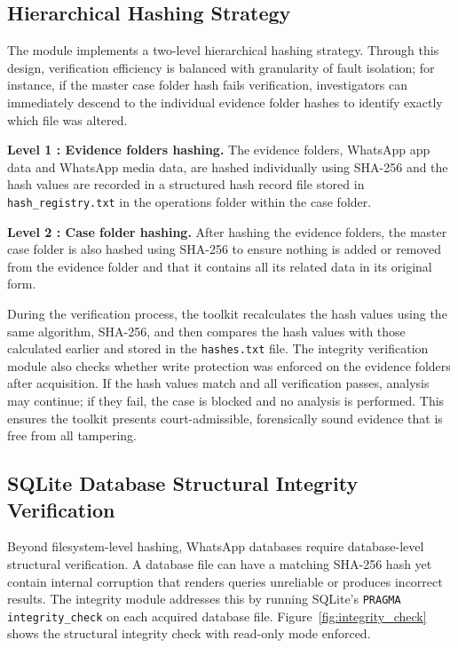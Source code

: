 \documentclass[12pt,a4paper]{report}
\begin{document}
\subsection{Hierarchical Hashing Strategy}

The module implements a two-level hierarchical hashing strategy. Through this design, verification efficiency is balanced with granularity of fault isolation; for instance, if the master case folder hash fails verification, investigators can immediately descend to the individual evidence folder hashes to identify exactly which file was altered.

\textbf{Level 1 : Evidence folders hashing.} The evidence folders, WhatsApp app data and WhatsApp media data, are hashed individually using SHA-256 and the hash values are recorded in a structured hash record file stored in \texttt{hash\_registry.txt} in the operations folder within the case folder.

\textbf{Level 2 : Case folder hashing.} After hashing the evidence folders, the master case folder is also hashed using SHA-256 to ensure nothing is added or removed from the evidence folder and that it contains all its related data in its original form.

During the verification process, the toolkit recalculates the hash values using the same algorithm, SHA-256, and then compares the hash values with those calculated earlier and stored in the \texttt{hashes.txt} file. The integrity verification module also checks whether write protection was enforced on the evidence folders after acquisition. If the hash values match and all verification passes, analysis may continue; if they fail, the case is blocked and no analysis is performed. This ensures the toolkit presents court-admissible, forensically sound evidence that is free from all tampering.

\subsection{SQLite Database Structural Integrity Verification}

Beyond filesystem-level hashing, WhatsApp databases require database-level structural verification. A database file can have a matching SHA-256 hash yet contain internal corruption that renders queries unreliable or produces incorrect results. The integrity module addresses this by running SQLite's \texttt{PRAGMA integrity\_check} on each acquired database file. Figure~\ref{fig:integrity_check} shows the structural integrity check with read-only mode enforced.
\end{document}
